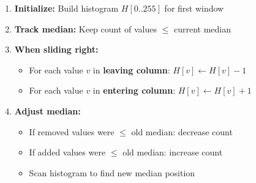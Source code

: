 \documentclass[12pt,a4paper]{article}
\begin{document}
\begin{enumerate}
    \item \textbf{Initialize:} Build histogram $H[0..255]$ for first window

    \item \textbf{Track median:} Keep count of values $\leq$ current median

    \item \textbf{When sliding right:}
    \begin{itemize}
        \item For each value $v$ in \textbf{leaving column}: $H[v] \leftarrow H[v] - 1$
        \item For each value $v$ in \textbf{entering column}: $H[v] \leftarrow H[v] + 1$
    \end{itemize}

    \item \textbf{Adjust median:}
    \begin{itemize}
        \item If removed values were $\leq$ old median: decrease count
        \item If added values were $\leq$ old median: increase count
        \item Scan histogram to find new median position
    \end{itemize}
\end{enumerate}
\end{document}
